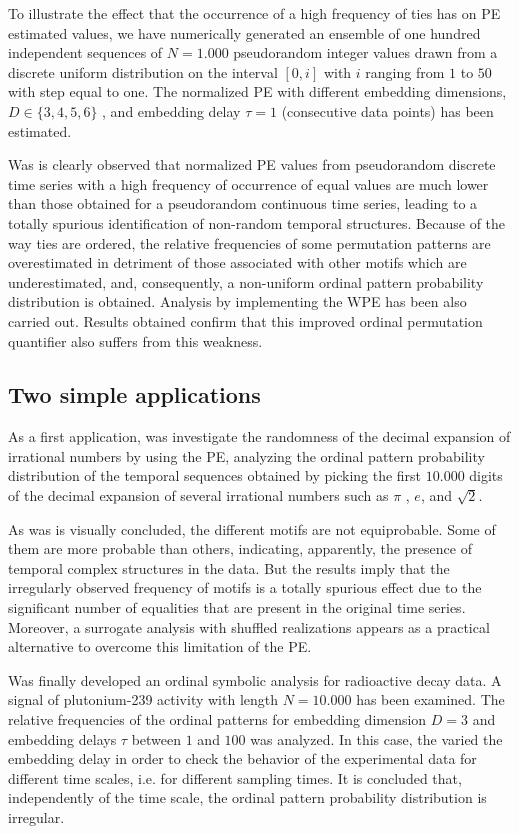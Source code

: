 \documentclass[11pt]{article}
\begin{document}
To illustrate the effect that the occurrence of a high frequency of ties has on PE estimated values, we have numerically generated an ensemble of one hundred independent sequences of $N = 1.000$ pseudorandom integer values drawn from a discrete uniform distribution on the interval $[0, i]$ with $i$ ranging from $1$ to $50$ with step equal to one.
The normalized PE with different embedding dimensions, $D \in \{ 3, 4, 5, 6\}$ , and embedding delay $\tau = 1$ (consecutive data points) has been estimated.

Was is clearly observed that normalized PE values from pseudorandom discrete time series with a high frequency of occurrence of equal values are much lower than those obtained for a pseudorandom continuous time series, leading to a totally spurious identification of non-random temporal structures. 
Because of the way ties are ordered, the relative frequencies of some permutation patterns are overestimated in detriment of those associated with other motifs which are underestimated, and, consequently, a non-uniform ordinal pattern probability distribution is obtained.
Analysis by implementing the WPE has been also carried out. 
Results obtained confirm that this improved ordinal permutation quantifier also suffers from this weakness.

\subsection*{Two simple applications}

As a first application, was investigate the randomness of the decimal expansion of irrational numbers by using the PE, analyzing the ordinal pattern probability distribution of the temporal sequences obtained by picking the first $10.000$ digits of the decimal expansion of several irrational numbers such as $\pi$ , $e$, and $\sqrt{2}$.

As was is visually concluded, the different motifs are not equiprobable. 
Some of them are more probable than others, indicating, apparently, the presence of temporal complex structures in the data. 
But the results imply that the irregularly observed frequency of motifs is a totally spurious effect due to the significant number of equalities that are present in the original time series. 
Moreover, a surrogate analysis with shuffled realizations appears as a practical alternative to overcome this limitation of the PE.

Was finally developed an ordinal symbolic analysis for radioactive decay data.
A signal of plutonium-239 activity with length $N = 10.000$ has been examined.
The relative frequencies of the ordinal patterns for embedding dimension $D = 3$ and embedding delays $\tau$ between $1$ and $100$ was analyzed.
In this case, the varied the embedding delay in order to check the behavior of the experimental data for different time scales, i.e. for different sampling times.
It is concluded that, independently of the time scale, the ordinal pattern probability distribution is irregular.
\newpage
\end{document}
